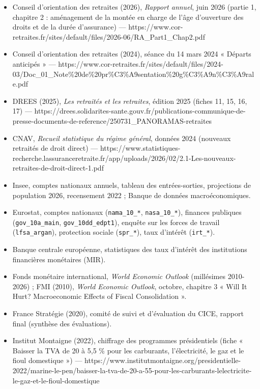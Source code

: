 \documentclass[
  11pt,
  11pt,
  a4paper,
  openany]{book}
\providecommand{\tightlist}{%
  \setlength{\itemsep}{0pt}\setlength{\parskip}{0pt}}
\begin{document}
\begin{itemize}
\tightlist
\item
  Conseil d'orientation des retraites (2026), \emph{Rapport annuel},
  juin 2026 (partie 1, chapitre 2 : aménagement de la montée en charge
  de l'âge d'ouverture des droits et de la durée d'assurance) ---
  https://www.cor-retraites.fr/sites/default/files/2026-06/RA\_Part1\_Chap2.pdf
\item
  Conseil d'orientation des retraites (2024), séance du 14 mars 2024 «
  Départs anticipés » ---
  https://www.cor-retraites.fr/sites/default/files/2024-03/Doc\_01\_Note\%20de\%20pr\%C3\%A9sentation\%20g\%C3\%A9n\%C3\%A9rale.pdf
\item
  DREES (2025), \emph{Les retraités et les retraites}, édition 2025
  (fiches 11, 15, 16, 17) ---
  https://drees.solidarites-sante.gouv.fr/publications-communique-de-presse-documents-de-reference/250731\_PANORAMAS-retraites
\item
  CNAV, \emph{Recueil statistique du régime général}, données 2024
  (nouveaux retraités de droit direct) ---
  https://www.statistiques-recherche.lassuranceretraite.fr/app/uploads/2026/02/2.1-Les-nouveaux-retraites-de-droit-direct-1.pdf
\item
  Insee, comptes nationaux annuels, tableau des entrées-sorties,
  projections de population 2026, recensement 2022 ; Banque de données
  macroéconomiques.
\item
  Eurostat, comptes nationaux (\texttt{nama\_10\_*},
  \texttt{nasa\_10\_*}), finances publiques (\texttt{gov\_10a\_main},
  \texttt{gov\_10dd\_edpt1}), enquête sur les forces de travail
  (\texttt{lfsa\_argan}), protection sociale (\texttt{spr\_*}), taux
  d'intérêt (\texttt{irt\_*}).
\item
  Banque centrale européenne, statistiques des taux d'intérêt des
  institutions financières monétaires (MIR).
\item
  Fonds monétaire international, \emph{World Economic Outlook}
  (millésimes 2010-2026) ; FMI (2010), \emph{World Economic Outlook},
  octobre, chapitre 3 « Will It Hurt? Macroeconomic Effects of Fiscal
  Consolidation ».
\item
  France Stratégie (2020), comité de suivi et d'évaluation du CICE,
  rapport final (synthèse des évaluations).
\item
  Institut Montaigne (2022), chiffrage des programmes présidentiels
  (fiche « Baisser la TVA de 20 à 5,5 \% pour les carburants,
  l'électricité, le gaz et le fioul domestique ») ---
  https://www.institutmontaigne.org/presidentielle-2022/marine-le-pen/baisser-la-tva-de-20-a-55-pour-les-carburants-lelectricite-le-gaz-et-le-fioul-domestique

\end{itemize}
\end{document}
